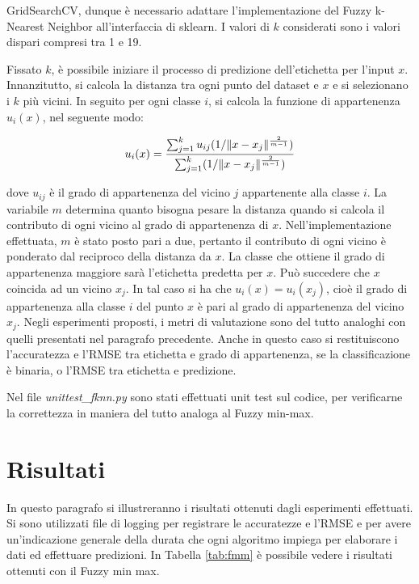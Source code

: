 \documentclass[11pt,  oneside, openany]{book}
\begin{document}
GridSearchCV, dunque è necessario adattare l'implementazione del Fuzzy k-Nearest Neighbor all'interfaccia di sklearn. I valori di $k$ considerati sono i valori dispari compresi tra 1 e 19. 

Fissato $k$, è possibile iniziare il processo di predizione dell'etichetta per l'input $x$. Innanzitutto, si calcola la distanza tra ogni punto del dataset e $x$ e si selezionano i $k$ più vicini. In seguito per ogni classe $i$, si calcola la funzione di appartenenza $u_{i}(x)$, nel seguente modo: 

\begin{equation} \label{eq:2}
u_{i}(x) = {\sum_{j=1}^k u_{ij}({1 / \Vert x-x_j\Vert^{\frac{2}{m-1}}}) \over \sum_{j=1}^k ({1 / \Vert x-x_j\Vert^{\frac{2}{m-1}}}) }
\end{equation}

\noindent dove $u_{ij}$ è il grado di appartenenza del vicino $j$ appartenente alla classe $i$. La variabile $m$ determina quanto bisogna pesare la distanza quando si calcola il contributo di ogni vicino al grado di appartenenza di $x$. Nell'implementazione effettuata, $m$ è stato posto pari a due, pertanto il contributo di ogni vicino è ponderato dal reciproco della distanza da $x$. La classe che ottiene il grado di appartenenza maggiore sarà l'etichetta predetta per $x$. Può succedere che $x$ coincida ad un vicino $x_j$. In tal caso si ha che $u_i(x) = u_i(x_j) $, cioè il grado di appartenenza alla classe $i$ del punto $x$ è pari al grado di appartenenza del vicino $x_j$. 
Negli esperimenti proposti, i metri di valutazione sono del tutto analoghi con quelli presentati nel paragrafo precedente. Anche in questo caso si restituiscono l'accuratezza e l'RMSE tra etichetta e grado di appartenenza, se la classificazione è binaria, o l'RMSE tra etichetta e predizione.  

Nel file \textit{unittest\_fknn.py} sono stati effettuati unit test sul codice, per verificarne la correttezza in maniera del tutto analoga al Fuzzy min-max. 

	\section{Risultati}


In questo paragrafo si illustreranno i risultati ottenuti dagli esperimenti effettuati. Si sono utilizzati file di logging per registrare le accuratezze e l'RMSE e per avere un'indicazione generale della durata che ogni algoritmo impiega per elaborare i dati ed effettuare predizioni. In Tabella \ref{tab:fmm} è possibile vedere i risultati ottenuti con il Fuzzy min max. 
\end{document}
